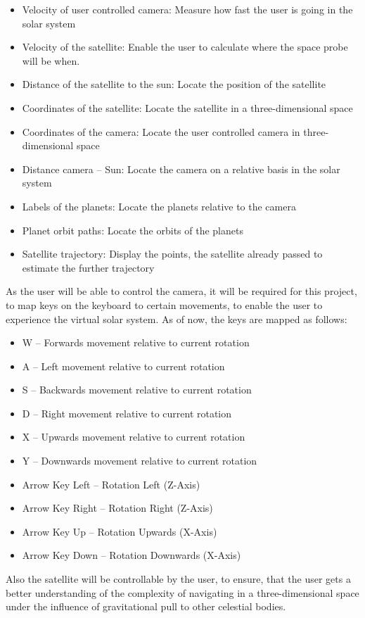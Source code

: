 \documentclass[conference,compsoc]{IEEEtran}
\begin{document}
\begin{itemize}
	\item Velocity of user controlled camera: Measure how fast the user is going in the solar system
	\item Velocity of the satellite: Enable the user to calculate where the space probe will be when.
	\item Distance of the satellite to the sun: Locate the position of the satellite
	\item Coordinates of the satellite: Locate the satellite in a three-dimensional space
	\item Coordinates of the camera: Locate the user controlled camera in three-dimensional space
	\item Distance camera – Sun: Locate the camera on a relative basis in the solar system
	\item Labels of the planets: Locate the planets relative to the camera
	\item Planet orbit paths: Locate the orbits of the planets
	\item Satellite trajectory: Display the points, the satellite already passed to estimate the further trajectory
\end{itemize}
As the user will be able to control the camera, it will be required for this project, to map keys on the keyboard to certain movements, to enable the user to experience the virtual solar system. As of now, the keys are mapped as follows:
\begin{itemize}
	\item W – Forwards movement relative to current rotation
	\item A – Left movement relative to current rotation
	\item S – Backwards movement relative to current rotation
	\item D – Right movement relative to current rotation
	\item X – Upwards movement relative to current rotation
	\item Y – Downwards movement relative to current rotation
	\item Arrow Key Left – Rotation Left (Z-Axis)
	\item Arrow Key Right – Rotation Right (Z-Axis)
	\item Arrow Key Up – Rotation Upwards (X-Axis)
	\item Arrow Key Down – Rotation Downwards (X-Axis)
\end{itemize}
Also the  satellite will be controllable by the user, to ensure, that the user gets a better understanding of the complexity of navigating in a three-dimensional space under the influence of gravitational pull to other celestial bodies. 
\end{document}
